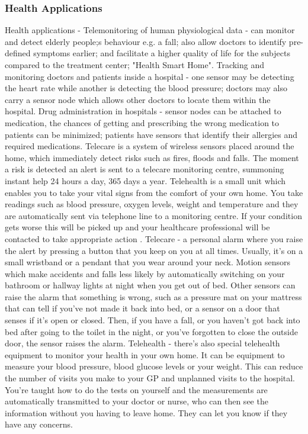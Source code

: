 \subsubsection{Health Applications}
Health applications - Telemonitoring of human physiological data - can monitor and detect elderly people;s behaviour e.g. a fall; also allow doctors to identify pre-defined symptoms earlier; and facilitate a higher quality of life for the subjects compared to the treatment center; "Health Smart Home". Tracking and monitoring doctors and patients inside a hospital - one sensor may be detecting the heart rate while another is detecting the blood pressure; doctors may also carry a sensor node which allows other doctors to locate them within the hospital. Drug administration in hospitals \cite{telemonitoring} - sensor nodes can be attached to medication, the chances of getting and prescribing the wrong medication to patients can be minimized; patients have sensors that identify their allergies and required medications. 
Telecare is a system of wireless sensors placed around the home, which immediately detect risks such as fires, floods and falls. The moment a risk is detected an alert is sent to a telecare monitoring centre, summoning instant help 24 hours a day, 365 days a year. Telehealth is a small unit which enables you to take your vital signs from the comfort of your own home. You take readings such as blood pressure, oxygen levels, weight and temperature and they are automatically sent via telephone line to a monitoring centre. If your condition gets worse this will be picked up and your healthcare professional will be contacted to take appropriate action \cite{telehealth}. 
Telecare - a personal alarm where you raise the alert by pressing a button that you keep on you at all times. Usually, it's on a small wristband or a pendant that you wear around your neck. Motion sensors which make accidents and falls less likely by automatically switching on your bathroom or hallway lights at night when you get out of bed. Other sensors can raise the alarm that something is wrong, such as a pressure mat on your mattress that can tell if you've not made it back into bed, or a sensor on a door that senses if it's open or closed. Then, if you have a fall, or you haven't got back into bed after going to the toilet in the night, or you've forgotten to close the outside door, the sensor raises the alarm. Telehealth - there's also special telehealth equipment to monitor your health in your own home. It can be equipment to measure your blood pressure, blood glucose levels or your weight. This can reduce the number of visits you make to your GP and unplanned visits to the hospital. You're taught how to do the tests on yourself and the measurements are automatically transmitted to your doctor or nurse, who can then see the information without you having to leave home. They can let you know if they have any concerns.

